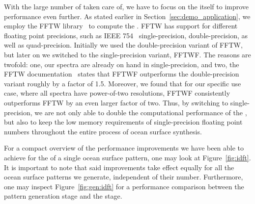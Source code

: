 With the large number of \InvDiscreteFourierTransforms taken care of, we have to
focus on the \IDFT itself to improve performance even further.
As stated earlier in Section~\ref{sec:demo_application}, we employ the FFTW
library~\cite{FFTW05} to compute the \InvDiscreteFourierTransform.
FFTW has support for different floating point
precisions, such as IEEE 754~\citep{IEEE:754} single-precision,
double-precision, as well as quad-precision. Initially we used the
double-precision variant of FFTW, but later on we switched to the
single-precision variant, FFTWF. The reasons are twofold: one, our spectra
are already on hand in single-precision, and two, the
FFTW documentation~\citep{misc:fftw:speed} states that FFTWF outperforms
the double-precision variant roughly by a factor of 1.5.
Moreover, we found that for our specific use case, where all spectra have
power-of-two resolutions, FFTWF consistently outperforms FFTW by an even larger
factor of two. Thus, by switching to single-precision, we are not only able to
double the computational performance of the \IDFT, but also to keep the low
memory requirements of single-precision floating point numbers throughout the
entire process of ocean surface synthesis.

For a compact overview of the performance improvements we have been able to
achieve for the \IDFTs of a single ocean surface pattern, one may look at
Figure~\ref{fig:idft}. It is important to note that said improvements take
effect equally for all the ocean surface patterns we generate, independent of
their number.
Furthermore, one may inspect Figure~\ref{fig:gen:idft}
for a performance comparison between the pattern generation stage and the
\InvDiscreteFourierTransform stage.

